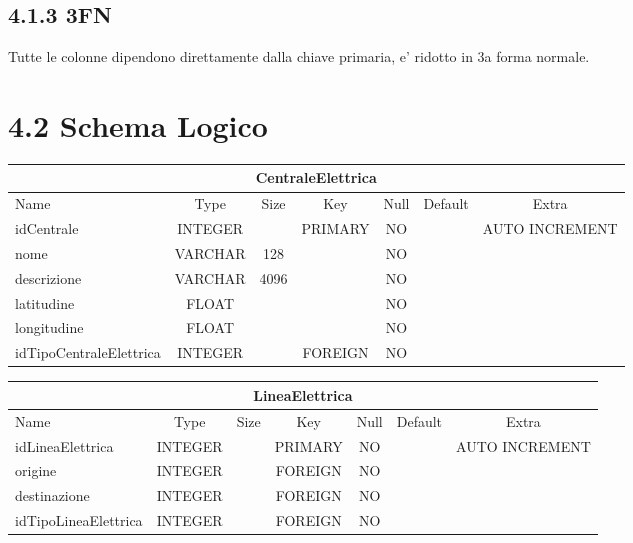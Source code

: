\subsection*{4.1.3 \hspace{1cm} 3FN}
Tutte le colonne dipendono direttamente dalla chiave primaria, e' ridotto in 3a forma normale. \\

\section*{4.2 \hspace{1cm} Schema Logico}

\begin{center}
    \begin{tabular}{ |l|c|c|c|c|c|c| } 
        \hline
        \multicolumn{7}{|c|}{CentraleElettrica} \\
        \hline
            Name                    & Type      & Size  & Key       & Null  & Default   & Extra \\
        \hline
            idCentrale              & INTEGER   &       & PRIMARY   & NO    &           & AUTO INCREMENT \\
            nome                    & VARCHAR   & 128   &           & NO    &           &                \\
            descrizione             & VARCHAR   & 4096  &           & NO    &           &                \\
            latitudine              & FLOAT     &       &           & NO    &           &                \\
            longitudine             & FLOAT     &       &           & NO    &           &                \\
            idTipoCentraleElettrica & INTEGER   &       & FOREIGN   & NO    &           &                \\
        \hline
    \end{tabular}
\end{center}


\begin{center}
    \begin{tabular}{ |l|c|c|c|c|c|c| } 
        \hline
        \multicolumn{7}{|c|}{LineaElettrica} \\
        \hline
            Name                 & Type     & Size  & Key       & Null  & Default   & Extra \\
        \hline
            idLineaElettrica     & INTEGER  &       & PRIMARY   & NO    &           & AUTO INCREMENT \\
            origine              & INTEGER  &       & FOREIGN   & NO    &           & \\
            destinazione         & INTEGER  &       & FOREIGN   & NO    &           & \\
            idTipoLineaElettrica & INTEGER  &       & FOREIGN   & NO    &           & \\
        \hline
    \end{tabular}
\end{center}


